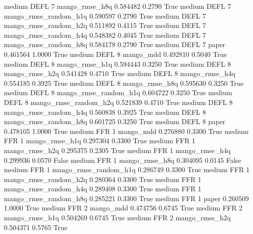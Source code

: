     medium     DEFL                 7        mango_rmse_h8q   0.584482      0.2790    True
    medium     DEFL                 7 mango_rmse_random_h1q   0.590597      0.2790    True
    medium     DEFL                 7 mango_rmse_random_h2q   0.511892      0.4115    True
    medium     DEFL                 7 mango_rmse_random_h4q   0.548382      0.4045    True
    medium     DEFL                 7 mango_rmse_random_h8q   0.584178      0.2790    True
    medium     DEFL                 7                 paper   0.461564      1.0000    True
    medium     DEFL                 8             mango_mdd   0.492810      0.5040    True
    medium     DEFL                 8        mango_rmse_h1q   0.594443      0.3250    True
    medium     DEFL                 8        mango_rmse_h2q   0.541428      0.4710    True
    medium     DEFL                 8        mango_rmse_h4q   0.554185      0.3925    True
    medium     DEFL                 8        mango_rmse_h8q   0.595630      0.3250    True
    medium     DEFL                 8 mango_rmse_random_h1q   0.604722      0.3250    True
    medium     DEFL                 8 mango_rmse_random_h2q   0.521839      0.4710    True
    medium     DEFL                 8 mango_rmse_random_h4q   0.560838      0.3925    True
    medium     DEFL                 8 mango_rmse_random_h8q   0.601725      0.3250    True
    medium     DEFL                 8                 paper   0.478105      1.0000    True
    medium      FFR                 1             mango_mdd   0.276880      0.3300    True
    medium      FFR                 1        mango_rmse_h1q   0.297304      0.3300    True
    medium      FFR                 1        mango_rmse_h2q   0.295375      0.2305    True
    medium      FFR                 1        mango_rmse_h4q   0.299936      0.0570   False
    medium      FFR                 1        mango_rmse_h8q   0.304095      0.0145   False
    medium      FFR                 1 mango_rmse_random_h1q   0.286749      0.3300    True
    medium      FFR                 1 mango_rmse_random_h2q   0.280364      0.3300    True
    medium      FFR                 1 mango_rmse_random_h4q   0.289408      0.3300    True
    medium      FFR                 1 mango_rmse_random_h8q   0.285221      0.3300    True
    medium      FFR                 1                 paper   0.260509      1.0000    True
    medium      FFR                 2             mango_mdd   0.474756      0.6745    True
    medium      FFR                 2        mango_rmse_h1q   0.504269      0.6745    True
    medium      FFR                 2        mango_rmse_h2q   0.504371      0.5765    True

